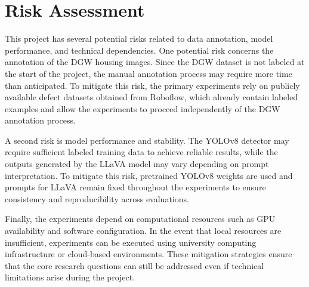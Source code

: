 \section{Risk Assessment}
\label{sec:riskassessment}

This project has several potential risks related to data annotation, model performance, and technical dependencies. One potential risk concerns the annotation of the DGW housing images. Since the DGW dataset is not labeled at the start of the project, the manual annotation process may require more time than anticipated. To mitigate this risk, the primary experiments rely on publicly available defect datasets obtained from Roboflow, which already contain labeled examples and allow the experiments to proceed independently of the DGW annotation process.

A second risk is model performance and stability. The YOLOv8 detector may require sufficient labeled training data to achieve reliable results, while the outputs generated by the LLaVA model may vary depending on prompt interpretation. To mitigate this risk, pretrained YOLOv8 weights are used and prompts for LLaVA remain fixed throughout the experiments to ensure consistency and reproducibility across evaluations.

Finally, the experiments depend on computational resources such as GPU availability and software configuration. In the event that local resources are insufficient, experiments can be executed using university computing infrastructure or cloud-based environments. These mitigation strategies ensure that the core research questions can still be addressed even if technical limitations arise during the project.